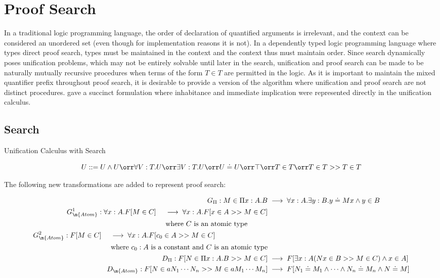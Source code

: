 \section{Proof Search}

In a traditional logic programming language, the order of declaration of quantified arguments is irrelevant, 
and the context can be considered an unordered set (even though for implementation reasons it is not). 
In a dependently typed logic programming language where types direct proof search, types must be maintained in the context
and the context thus must maintain order.   Since search dynamically poses unification problems, which may not be 
entirely solvable until later in the search, unification and proof search can be made to be 
naturally mutually recursive procedures when terms of the form $T \in T$ are permitted in the logic.
As it is important to maintain the mixed quantifier prefix throughout proof search, it is desirable to provide a version 
of the algorithm where unification and proof search are not distinct procedures. 
\citet{pfenning1991logic} gave a succinct formulation where inhabitance and immediate implication were represented
directly in the unification calculus.  

\subsection{Search}

\begin{definition}
Unification Calculus with Search

\[
U ::= U \wedge U 
 \orr \forall V : T . U
 \orr \exists V : T . U 
 \orr U \doteq U
 \orr \top
  \orr T \in T 
  \orr T \in T >> T \in T
\]

\end{definition}

The following new transformations are added to represent proof search:

\begin{align}
G_\Pi : M \in \Pi x : A . B   &\UnifiesTo \forall x : A . \exists y : B . y \doteq M x \wedge y \in B
\\
\begin{split}
G^1_\m{Atom} : \forall x : A . F[M\in C]  &\quad\UnifiesTo \forall x : A . F[x \in A >> M \in C]
\\
&\quad\text{ where $C$ is an atomic type}
\end{split}
\\
\begin{split}
G^2_\m{Atom} : F[M\in C] &\quad\UnifiesTo\forall x : A . F[c_0 \in A >> M \in C]
\\
&\quad\text{ where $c_0 : A$ is a constant and $C$ is an atomic type}
\end{split}
\\
D_\Pi : 
F[N\in \Pi x : A . B >> M \in C ]
&\UnifiesTo 
F[\exists x : A ( N x \in B >> M \in C) \wedge x \in A]
\\
D_\m{Atom} : 
F[N\in a N_1 \cdots N_n >> M \in a M_1 \cdots M_n] 
&\UnifiesTo 
F[N_1 \doteq M_1 \wedge \cdots \wedge N_n \doteq M_n \wedge N \doteq M]
\end{align}

